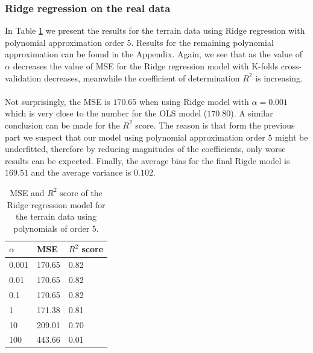 \documentclass [11pt]{article}
\begin{document}
\subsubsection{Ridge regression on the real data}
In Table \ref{tab:ridge5Terrain} we present the results for the terrain data using Ridge regression with polynomial approximation order $5$. Results for the remaining polynomial approximation can be found in the Appendix. Again, we see that as the value of $\alpha$ decreases the value of MSE for the Ridge regression model with K-folds cross-validation decreases, meanwhile the coefficient of determination $R^{2}$ is increasing.\\
\\
Not surprisingly, the MSE is $170.65$ when using Ridge model with $\alpha=0.001$ which is very close to the number for the OLS model ($170.80$). A similar conclusion can be made for the $R^{2}$ score. The reason is that form the previous part we suspect that our model using polynomial approximation order $5$ might be underfitted, therefore by reducing magnitudes of the coefficients, only worse  results can be expected. Finally, the average bias for the final Rigde model is $169.51$ and the average variance is $0.102$.


\begin{table}[H]
\centering
\begin{tabular}{lll}
\hline
$\alpha$ & MSE    & $R^{2}$ score \\ \hline
0.001     & 170.65 & 0.82          \\
0.01      & 170.65 & 0.82          \\
0.1       & 170.65 & 0.82         \\
1         & 171.38 & 0.81          \\
10        & 209.01 & 0.70          \\
100       & 443.66 & 0.01          \\ \hline
\end{tabular}
\caption{MSE and $R^{2}$ score of the Ridge regression model for the terrain data using polynomials of order $5$.}
\label{tab:ridge5Terrain}
\end{table}
\end{document}
